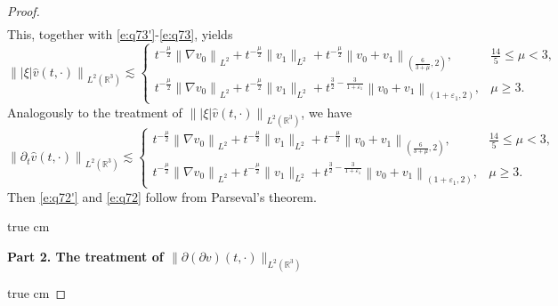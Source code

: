 \documentclass[11pt,twoside]{article}
\newcommand{\R}{\mathbb R}
\newcommand{\p}{\partial}
\newcommand{\f}{\frac}
\theoremstyle{plain}
\theoremstyle{definition}
\theoremstyle{remark}
\numberwithin{equation}{section}
\begin{document}
\begin{proof}
$$\begin{aligned}
\end{aligned}
$$
This, together with \eqref{e:q73'}-\eqref{e:q73}, yields
$$
\left\||\xi|\hat{v}(t, \cdot)\right\|_{L^2(\R^3)}\lesssim \begin{cases} t^{-\frac{\mu}{2}}\left\|\nabla v_{0}\right\|_{L^{2}}+ t^{-\f{\mu}{2}}\|v_1\|_{L^{2}} + t^{-\f{\mu}{2}}\left\|v_0+v_1\right\|_{(\f{6}{3+\mu},2)},& \f{14}{5}\leq\mu<3,\\
t^{-\frac{\mu}{2}}\left\|\nabla v_{0}\right\|_{L^{2}}+ t^{-\f{\mu}{2}}\|v_1\|_{L^{2}}+ t^{\f32-\f{3}{1+\varepsilon_1}}\left\|v_0+v_1\right\|_{(1+\varepsilon_1,2)},& \mu \geq3.
\end{cases}
$$
Analogously to the treatment of $\left\||\xi|\hat{v}(t, \cdot)\right\|_{L^2(\R^3)}$,  we have
$$
\left\|\p_t\hat{v}(t, \cdot)\right\|_{L^2(\R^3)}\lesssim \begin{cases} t^{-\frac{\mu}{2}}\left\|\nabla v_{0}\right\|_{L^{2}}+ t^{-\f{\mu}{2}}\|v_1\|_{L^{2}} + t^{-\f{\mu}{2}}\left\|v_0+v_1\right\|_{(\f{6}{3+\mu},2)},&  \f{14}{5}\leq\mu<3,\\
t^{-\frac{\mu}{2}}\left\|\nabla v_{0}\right\|_{L^{2}}+ t^{-\f{\mu}{2}}\|v_1\|_{L^{2}}+ t^{\f32-\f{3}{1+\varepsilon_1}}\left\|v_0+v_1\right\|_{(1+\varepsilon_1,2)},&  \mu \geq3.
\end{cases}
$$
Then \eqref{e:q72'} and \eqref{e:q72} follow from Parseval's theorem.



 true cm

{\bf Part 2.  The treatment  of $\|\p(\p v)(t, \cdot)\|_{L^2(\R^3)}$ }

 true cm


\end{proof}
\end{document}
